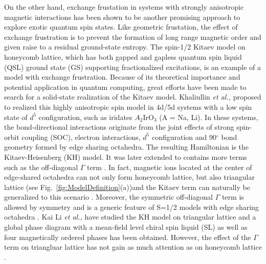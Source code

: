\documentclass[aps,prb,reprint,amsfonts,amsmath,amssymb,showpacs,groupedaddress,superscriptaddress]{revtex4-1}
\begin{document}
On the other hand, exchange frustation in systems with strongly anisotropic magnetic interactions has been shown to be another promising approach to explore exotic quantum spin states. Like geometric frustation, the effect of exchange frustration is to prevent the formation of long range magnetic order and given raise to a residual ground-state entropy. The spin-1/2 Kitaev model \cite{Kitaev2006} on honeycomb lattice, which has both gapped and gapless quantum spin liquid (QSL) ground state (GS) supporting fractionalized excitations, is an example of a model with exchange frustration. Because of its theoretical importance and potential application in quantum computing, great efforts have been made to search for a solid-state realization of the Kitaev model. Khaliullin \emph{et al.,} \cite{Khaliullin2005, PhysRevLett.102.017205} proposed to realized this highly anisotropic spin model in 4d/5d systems with a low spin state of $d^5$ configuration, such as iridates $A_2$IrO$_3$ (A = Na, Li). In these systems, the bond-directional interactions originate from the joint effects of strong spin-orbit coupling (SOC), electron interactions, $d^5$ configuration and 90$^\circ$ bond geometry formed by edge sharing octahedra. The resulting Hamiltonian is the Kitaev-Heisenberg (KH) model. It was later extended to contains more terms such as the off-diagonal $\Gamma$ term \cite{PhysRevLett.112.077204}. In fact, magnetic ions located at the center of edge-shared octahedra can not only form honeycomb lattice, but also triangular lattice (see Fig.~\ref{fig:ModelDefinition}(a))and the Kitaev term can naturally be generalized to this scenario \cite{PhysRevB.93.104417,PhysRevB.89.014414}. Moreover, the symmetric off-diagonal $\Gamma$ term is allowed by symmetry and is a generic feature of S=1/2 models with edge sharing octahedra \cite {PhysRevLett.112.077204}. Kai Li \emph{et al.,} \cite{KaiLi2015} have studied the KH model on triangular lattice and a global phase diagram with a mean-field level chiral spin liquid (SL) as well as four magnetically ordered phases has been obtained. However, the effect of the $\Gamma$ term on triangluar lattice has not gain as much attention as on honeycomb lattice \cite{PhysRevLett.112.077204,Rau2014,PhysRevLett.118.107203,PhysRevB.96.115103,PhysRevB.93.214431,PhysRevB.100.144422}.
\end{document}
